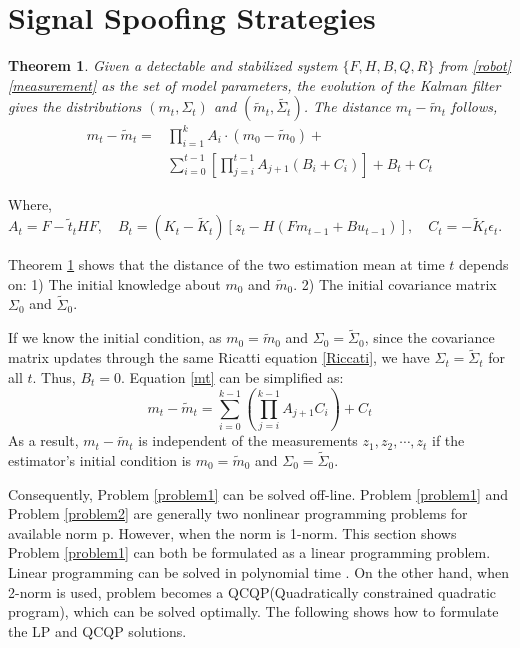 \documentclass[letterpaper, 10 pt, conference]{ieeeconf}  %
\newtheorem{theorem}{Theorem}
\begin{document}
\section{Signal Spoofing Strategies}

\begin{theorem} \label{mk} 
Given a detectable and stabilized system $\{F, H, B, Q, R \}$ from \eqref{robot} \eqref{measurement} as the set of model parameters, the evolution of the Kalman filter gives the distributions $(m_t, \Sigma_t)$ and $(\tilde{m}_t, \tilde{\Sigma_t})$. The distance $m_t  - \tilde{m}_t$ follows,
\begin{equation} \label{mt}
\begin{split}
m_t  - \tilde{m}_t = &\prod_{i=1}^kA_i\cdot (m_0  - \tilde{m}_0) + \\
&\sum_{i=0}^{t-1} \left[ \prod_{j=i}^{t-1}A_{j+1}  (B_i + C_i) \right] +B_t + C_t
\end{split}
\end{equation}
\end{theorem}
Where,
$A_t = F - \tilde{t}_t HF,\quad B_t = (K_t-\tilde{K}_t)\left[z_t-H(Fm_{t-1}+Bu_{t-1})\right], \quad
C_t= - \tilde{K}_t \epsilon_t$.


Theorem \ref{mk} shows that the distance of the two estimation mean at time $t$ depends on: 1) The initial knowledge about $m_0$ and $\tilde{m}_0$. 2) The initial covariance matrix $\Sigma_0$ and $\tilde{\Sigma}_0$.

If we know the initial condition, as $m_0=\tilde{m}_0$ and $\Sigma_0 = \tilde{\Sigma}_0$,  since the covariance matrix updates through the same Ricatti equation \eqref{Riccati}, we have $\Sigma_t = \tilde{\Sigma}_t$ for all $t$. Thus, $B_t = 0$. Equation \eqref{mt} can be simplified as:
$$  m_t  - \tilde{m}_t =\sum_{i=0}^{k-1} \left(\prod_{j=i}^{k-1}A_{j+1}  C_i\right) + C_t $$
 As a result, $m_t  - \tilde{m}_t $ is independent of the measurements $z_1, z_2, \cdots, z_t$  if the estimator's initial condition is $m_0=\tilde{m}_0$ and $\Sigma_0 = \tilde{\Sigma}_0$.

Consequently, Problem \ref{problem1} can be solved off-line. Problem \ref{problem1} and Problem \ref{problem2} are generally two nonlinear programming problems for available norm p. However, when the norm is 1-norm. This section shows Problem \ref{problem1}  can both be formulated as a linear programming problem. Linear programming  can be solved in polynomial time \cite{karmarkar1984new}. On the other hand, when  2-norm is used, problem becomes a QCQP(Quadratically constrained quadratic program), which can be solved optimally. The following shows how to formulate the LP and QCQP solutions.
\end{document}
